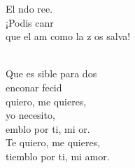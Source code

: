 \begin{cancion}
\begin{chorus}
	El ndo ree.\\
	¡Podis canr\\
	que el am como la z os salva!\\
	\end{chorus}%
	\jump\\
	Que es sible para dos \\
	enconar fecid\\
	quiero, me quieres,\\
	yo  necesito,\\
	emblo por ti, mi or.\\
Te quiero, me quieres,\\
tiemblo por ti, mi amor.\\
\end{cancion}%
